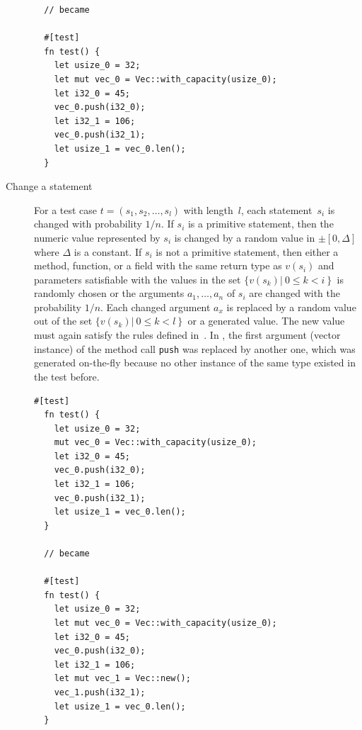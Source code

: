 \documentclass[paper=a4,%
  twoside,%
  BCOR4mm,%
  abstract=true,%
  toc=bibliography,%
  chapterprefix=true,%
  toc=bibliographynumbered,%
  open=right,%
  english,%
  pagesize=pdftex]{scrreprt}
\begin{document}
\begin{description}
\begin{lstlisting}
  // became

  #[test]
  fn test() {
    let usize_0 = 32;
    let mut vec_0 = Vec::with_capacity(usize_0);
    let i32_0 = 45;
    vec_0.push(i32_0);
    let i32_1 = 106;
    vec_0.push(i32_1);
    let usize_1 = vec_0.len();
  }
  \end{lstlisting}

  \item[Change a statement] For a test case $t = (s_1, s_2, \dots, s_l)$ with length~$l$, each statement~$s_i$ is changed with probability $1/n$. If $s_i$ is a primitive statement, then the numeric value represented by $s_i$ is changed by a random value in $\pm[0,\Delta]$ where $\Delta$ is a constant. If $s_i$ is not a primitive statement, then either a method, function, or a field with the same return type as $v(s_i)$ and parameters satisfiable with the values in the set $\{v(s_k) \left|~0 \leq k < i \right\}$ is randomly chosen or the arguments $a_1, \dots, a_n$ of $s_i$ are changed with the probability $1/n$. Each changed argument $a_x$ is replaced by a random value out of the set $\{v(s_k) \left|~0 \leq k < l \right\}$ or a generated value. The new value must again satisfy the rules defined in~. In , the first argument (vector instance) of the method call \texttt{push} was replaced by another one, which was generated on-the-fly because no other instance of the same type existed in the test before.

  \begin{lstlisting}[style=boxed, label=lst:mutation-input-value, caption={The first argument (which effectively is the method owner) of the call to \emph{push} (line 8) has been changed to a newly created value \emph{vec\string_1}}]
  #[test]
  fn test() {
    let usize_0 = 32;
    mut vec_0 = Vec::with_capacity(usize_0);
    let i32_0 = 45;
    vec_0.push(i32_0);
    let i32_1 = 106;
    vec_0.push(i32_1);
    let usize_1 = vec_0.len();
  }

  // became

  #[test]
  fn test() {
    let usize_0 = 32;
    let mut vec_0 = Vec::with_capacity(usize_0);
    let i32_0 = 45;
    vec_0.push(i32_0);
    let i32_1 = 106;
    let mut vec_1 = Vec::new();
    vec_1.push(i32_1);
    let usize_1 = vec_0.len();
  }
  \end{lstlisting}


\end{description}
\end{document}
